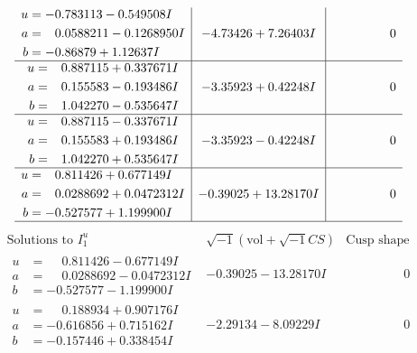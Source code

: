 \documentclass[1p]{elsarticle_modified}
\theoremstyle{definition}
\newcommand{\I}{\sqrt{-1}}
\begin{document}
$$\begin{array}{c|c|c}
\begin{aligned}
u &= -0.783113 - 0.549508 I \\
a &= \phantom{-}0.0588211 - 0.1268950 I \\
b &= -0.86879 + 1.12637 I\end{aligned}
 & -4.73426 + 7.26403 I & \phantom{-0.000000 } 0 \\ \hline\begin{aligned}
u &= \phantom{-}0.887115 + 0.337671 I \\
a &= \phantom{-}0.155583 - 0.193486 I \\
b &= \phantom{-}1.042270 - 0.535647 I\end{aligned}
 & -3.35923 + 0.42248 I & \phantom{-0.000000 } 0 \\ \hline\begin{aligned}
u &= \phantom{-}0.887115 - 0.337671 I \\
a &= \phantom{-}0.155583 + 0.193486 I \\
b &= \phantom{-}1.042270 + 0.535647 I\end{aligned}
 & -3.35923 - 0.42248 I & \phantom{-0.000000 } 0 \\ \hline\begin{aligned}
u &= \phantom{-}0.811426 + 0.677149 I \\
a &= \phantom{-}0.0288692 + 0.0472312 I \\
b &= -0.527577 + 1.199900 I\end{aligned}
 & -0.39025 + 13.28170 I & \phantom{-0.000000 } 0\\
 \hline 
 \end{array}$$\newpage$$\begin{array}{c|c|c}  
\text{Solutions to }I^u_{1}& \I (\text{vol} + \sqrt{-1}CS) & \text{Cusp shape}\\
 \hline 
\begin{aligned}
u &= \phantom{-}0.811426 - 0.677149 I \\
a &= \phantom{-}0.0288692 - 0.0472312 I \\
b &= -0.527577 - 1.199900 I\end{aligned}
 & -0.39025 - 13.28170 I & \phantom{-0.000000 } 0 \\ \hline\begin{aligned}
u &= \phantom{-}0.188934 + 0.907176 I \\
a &= -0.616856 + 0.715162 I \\
b &= -0.157446 + 0.338454 I\end{aligned}
 & -2.29134 - 8.09229 I & \phantom{-0.000000 } 0 \\ \hline\begin{aligned}

\end{aligned}
\end{array}$$
\end{document}
